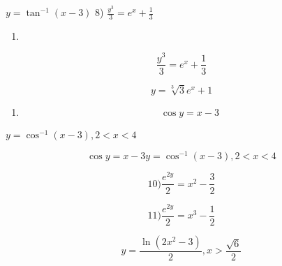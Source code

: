 \documentclass[
]{article}
\providecommand{\tightlist}{%
  \setlength{\itemsep}{0pt}\setlength{\parskip}{0pt}}
\begin{document}
\(y = \tan^{-1}(x - 3)\) 8) \(\frac{y^3}{3} = e^x + \frac{1}{3}\)

\begin{enumerate}
\def\labelenumi{\arabic{enumi})}
\setcounter{enumi}{7}
\tightlist
\item
\end{enumerate}

\[\frac{y^3}{3} = e^x + \frac{1}{3}\]

\[y = \sqrt[3]{3}e^x + 1\]

\begin{enumerate}
\def\labelenumi{\arabic{enumi})}
\setcounter{enumi}{8}
\tightlist
\item
  \[\cos y = x - 3\]
\end{enumerate}

\(y = \cos^{-1}(x - 3), 2 < x < 4\)

\[\cos y = x - 3 y = \cos^{-1}(x - 3), 2 < x < 4\]

\[10) \frac{e^{2y}}{2} = x^2 - \frac{3}{2}\]

\[11) \frac{e^{2y}}{2} = x^3 - \frac{1}{2}\]

\[y = \frac{\ln(2x^2 - 3)}{2}, x > \frac{\sqrt{6}}{2}\]
\end{document}
